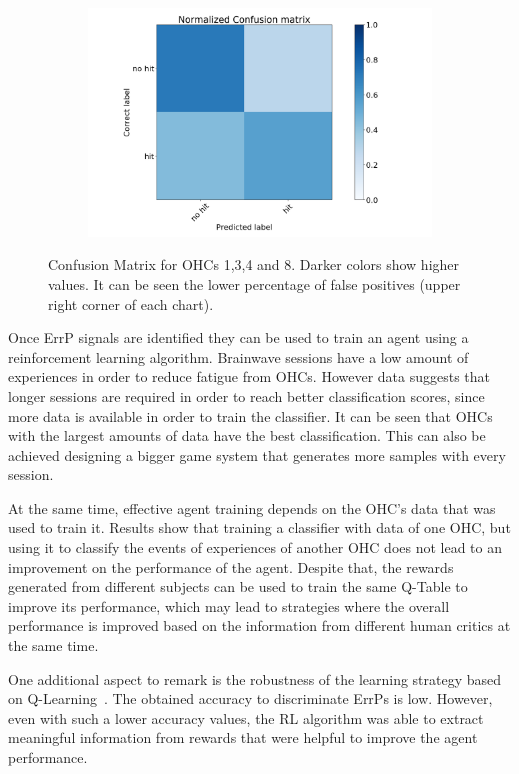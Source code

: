 \documentclass[journal]{IEEEtran}
\begin{document}
{{\begin{figure}[h!]
\begin{subfigure}{0.5\textwidth}
\includegraphics[scale=0.12]{Images/Classification_test/matrix_h.png}
\end{subfigure}
\caption{Confusion Matrix for OHCs 1,3,4 and 8. Darker colors show higher values.  It can be seen the lower percentage of false positives (upper right corner of each chart).}
\label{fig:confusionmatrix}
\end{figure}

Once ErrP signals are identified they can be used to train an agent using a reinforcement learning algorithm. Brainwave sessions have a low amount of experiences in order to reduce fatigue from OHCs. However data suggests that longer sessions are required in order to reach better classification scores, since more data is available in order to train the classifier. It can be seen that OHCs with the largest amounts of data have the best classification. This can also be achieved designing a bigger game system that generates more samples with every session.

At the same time, effective agent training depends on the OHC's data that was used to train it. Results show that training a classifier with data of one OHC, but using it to classify the events of experiences of another OHC does not lead to an improvement on the performance of the agent. Despite that, the rewards generated from different subjects can be used to train the same Q-Table to improve its performance, which may lead to strategies where the overall performance is improved based on the information from different human critics at the same time.

One additional aspect to remark is the robustness of the learning strategy based on Q-Learning~\cite{Bauer2015,Rubin2012}.  The obtained accuracy to discriminate ErrPs is low.  However, even with such a lower accuracy values, the RL algorithm was able to extract meaningful information from rewards that were helpful to improve the agent performance.  

}}
\end{document}

